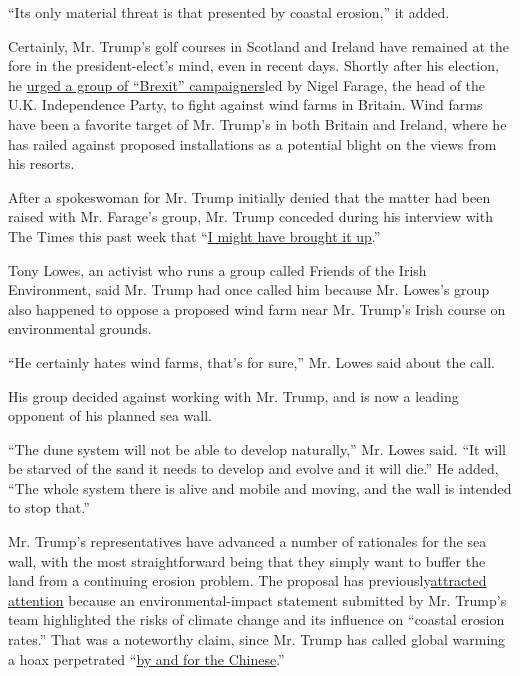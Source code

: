 ``Its only material threat is that presented by coastal erosion,'' it
added.

Certainly, Mr. Trump's golf courses in Scotland and Ireland have
remained at the fore in the president-elect's mind, even in recent days.
Shortly after his election, he
\href{http://www.nytimes.com/2016/11/21/business/with-a-meeting-trump-renewed-a-british-wind-farm-fight.html}{urged
a group of ``Brexit'' campaigners}led by Nigel Farage, the head of the
U.K. Independence Party, to fight against wind farms in Britain. Wind
farms have been a favorite target of Mr. Trump's in both Britain and
Ireland, where he has railed against proposed installations as a
potential blight on the views from his resorts.

After a spokeswoman for Mr. Trump initially denied that the matter had
been raised with Mr. Farage's group, Mr. Trump conceded during his
interview with The Times this past week that
``\href{https://twitter.com/maggieNYT/status/801130374566998016}{I might
have brought it up}.''

Tony Lowes, an activist who runs a group called Friends of the Irish
Environment, said Mr. Trump had once called him because Mr. Lowes's
group also happened to oppose a proposed wind farm near Mr. Trump's
Irish course on environmental grounds.

``He certainly hates wind farms, that's for sure,'' Mr. Lowes said about
the call.

His group decided against working with Mr. Trump, and is now a leading
opponent of his planned sea wall.

``The dune system will not be able to develop naturally,'' Mr. Lowes
said. ``It will be starved of the sand it needs to develop and evolve
and it will die.'' He added, ``The whole system there is alive and
mobile and moving, and the wall is intended to stop that.''

Mr. Trump's representatives have advanced a number of rationales for the
sea wall, with the most straightforward being that they simply want to
buffer the land from a continuing erosion problem. The proposal has
previously\href{http://www.politico.com/story/2016/05/donald-trump-climate-change-golf-course-223436}{attracted
attention} because an environmental-impact statement submitted by Mr.
Trump's team highlighted the risks of climate change and its influence
on ``coastal erosion rates.'' That was a noteworthy claim, since Mr.
Trump has called global warming a hoax perpetrated
``\href{https://twitter.com/realdonaldtrump/status/265895292191248385?lang=en-gb}{by
and for the Chinese}.''

